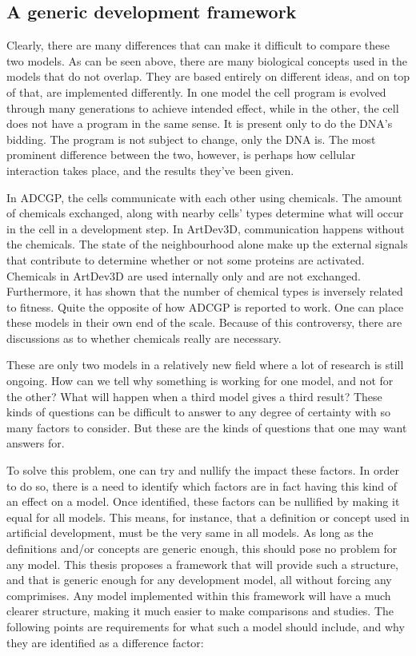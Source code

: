 \subsection{A generic development framework}
\label{sec:framework_requirements}
Clearly, there are many differences that can make it difficult to compare these two models. As can be seen above, there are many biological concepts used in the models that do not overlap. They are based entirely on different ideas, and on top of that, are implemented differently. In one model the cell program is evolved through many generations to achieve intended effect, while in the other, the cell does not have a program in the same sense. It is present only to do the DNA's bidding. The program is not subject to change, only the DNA is. The most prominent difference between the two, however, is perhaps how cellular interaction takes place, and the results they've been given.

In ADCGP, the cells communicate with each other using chemicals. The amount of chemicals exchanged, along with nearby cells' types determine what will occur in the cell in a development step. In ArtDev3D, communication happens without the chemicals. The state of the neighbourhood alone make up the external signals that contribute to determine whether or not some proteins are activated. Chemicals in ArtDev3D are used internally only and are not exchanged. Furthermore, it has shown that the number of chemical types is inversely related to fitness. Quite the opposite of how ADCGP is reported to work. One can place these models in their own end of the scale. Because of this controversy, there are discussions as to whether chemicals really are necessary.

These are only two models in a relatively new field where a lot of research is still ongoing. How can we tell why something is working for one model, and not for the other? What will happen when a third model gives a third result? These kinds of questions can be difficult to answer to any degree of certainty with so many factors to consider. But these are the kinds of questions that one may want answers for.

To solve this problem, one can try and nullify the impact these factors. In order to do so, there is a need to identify which factors are in fact having this kind of an effect on a model. Once identified, these factors can be nullified by making it equal for all models. This means, for instance, that a definition or concept used in artificial development, must be the very same in all models. As long as the definitions and/or concepts are generic enough, this should pose no problem for any model. This thesis proposes a framework that will provide such a structure, and that is generic enough for any development model, all without forcing any comprimises. Any model implemented within this framework will have a much clearer structure, making it much easier to make comparisons and studies. The following points are requirements for what such a model should include, and why they are identified as a difference factor:

